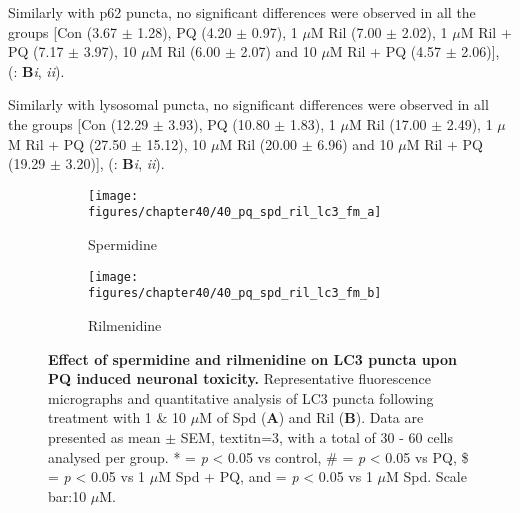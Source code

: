 Similarly with p62 puncta, no significant differences were observed in all the groups [Con (3.67 $\pm$ 1.28), PQ (4.20 $\pm$ 0.97), 1 $\mu$M Ril (7.00 $\pm$ 2.02), 1 $\mu$M Ril + PQ (7.17 $\pm$ 3.97), 10 $\mu$M Ril (6.00 $\pm$ 2.07) and 10 $\mu$M Ril + PQ (4.57 $\pm$ 2.06)], (: \textbf{B}\textit{i}, \textit{ii}).

Similarly with lysosomal puncta, no significant differences were observed in all the groups [Con (12.29 $\pm$ 3.93), PQ (10.80 $\pm$ 1.83), 1 $\mu$M Ril (17.00 $\pm$ 2.49), 1 $\mu$M Ril + PQ (27.50 $\pm$ 15.12), 10 $\mu$M Ril (20.00 $\pm$ 6.96) and 10 $\mu$M Ril + PQ (19.29 $\pm$ 3.20)], (: \textbf{B}\textit{i}, \textit{ii}).

\begin{figure}[!htbp]
  \center
  \begin{subfigure}[b]{0.495\linewidth}
    \texttt{[image: figures/chapter40/40\_pq\_spd\_ril\_lc3\_fm\_a]}
    \caption{Spermidine}
  \end{subfigure}
  \begin{subfigure}[b]{0.495\linewidth}
    \texttt{[image: figures/chapter40/40\_pq\_spd\_ril\_lc3\_fm\_b]}
    \caption{Rilmenidine}
  \end{subfigure}
  \caption[Effect of spermidine and rilmenidine on LC3 puncta upon PQ induced neuronal toxicity]{\textbf{Effect of spermidine and rilmenidine on LC3 puncta upon PQ induced neuronal toxicity.} Representative fluorescence micrographs and quantitative analysis of LC3 puncta following treatment with 1 \& 10 $\mu$M of Spd (\textbf{A}) and Ril (\textbf{B}). Data are presented as mean $\pm$ SEM, textit{n}=3, with a total of 30 - 60 cells analysed per group. * = \textit{p} < 0.05 vs control, \# = \textit{p} < 0.05 vs PQ, \$ = \textit{p} < 0.05 vs 1 $\mu$M Spd + PQ, and \@ = \textit{p} < 0.05 vs 1 $\mu$M Spd. Scale bar:10 $\mu$M.}
  \label{fig:40_pq_spd_ril_lc3_fm_a}
\end{figure}

